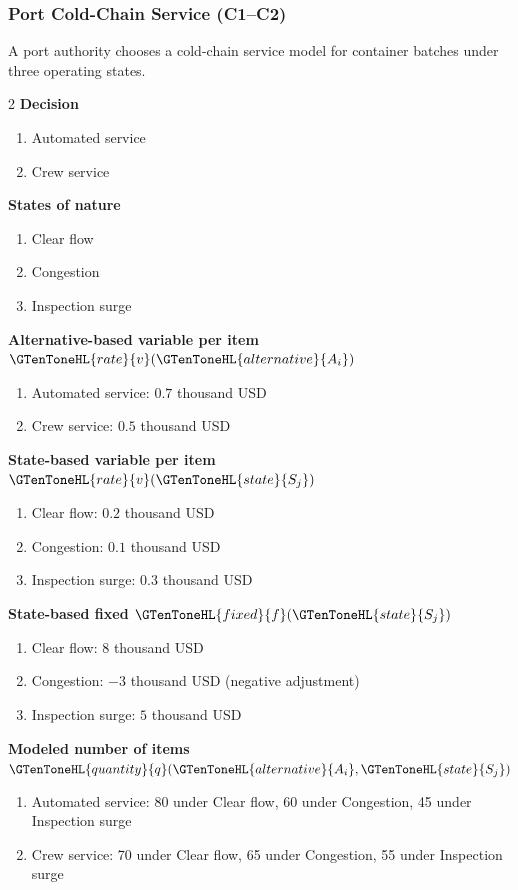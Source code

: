 	\subsubsection{Port Cold-Chain Service (C1--C2)}
	\label{sec:problem29-port-cold-chain-service-c1-c2}
	A port authority chooses a cold-chain service model for container batches under three operating states.
	\begin{multicols}{2}
	\textbf{Decision }
	\begin{enumerate}[label=\arabic*.]
\item Automated service
\item Crew service
	\end{enumerate}
	\textbf{States of nature}
	\begin{enumerate}[label=\arabic*.]
\item Clear flow
\item Congestion
\item Inspection surge
	\end{enumerate}
	\columnbreak
	\textbf{Alternative-based variable  per item $\GTenToneHL{rate}{v}(\GTenToneHL{alternative}{A_i})$}
\begin{enumerate}[label=\arabic*.]
\item Automated service: $0.7$ thousand USD
\item Crew service: $0.5$ thousand USD\end{enumerate}
\textbf{State-based variable  per item $\GTenToneHL{rate}{v}(\GTenToneHL{state}{S_j})$}
\begin{enumerate}[label=\arabic*.]
\item Clear flow: $0.2$ thousand USD
\item Congestion: $0.1$ thousand USD
\item Inspection surge: $0.3$ thousand USD\end{enumerate}
\textbf{State-based fixed  $\GTenToneHL{fixed}{f}(\GTenToneHL{state}{S_j})$}
\begin{enumerate}[label=\arabic*.]
\item Clear flow: $8$ thousand USD
\item Congestion: $-3$ thousand USD (negative adjustment)
\item Inspection surge: $5$ thousand USD\end{enumerate}
\textbf{Modeled number of items $\GTenToneHL{quantity}{q}(\GTenToneHL{alternative}{A_i},\GTenToneHL{state}{S_j})$}
\begin{enumerate}[label=\arabic*.]
\item Automated service: 80 under Clear flow, 60 under Congestion, 45 under Inspection surge
\item Crew service: 70 under Clear flow, 65 under Congestion, 55 under Inspection surge
\end{enumerate}
	\end{multicols}

